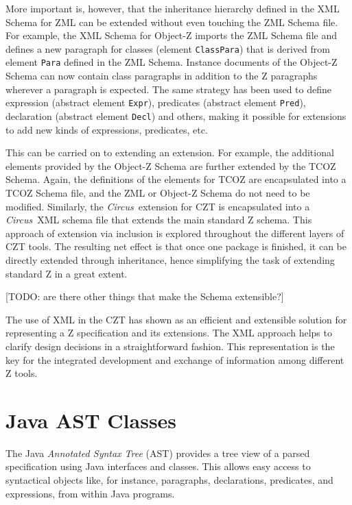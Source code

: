 \documentclass{llncs}
\newcommand{\Circus}{{\sf\slshape Circus}}
\newcommand{\Element}[1]{\texttt{#1}}
\begin{document}
  More important is, however, that the inheritance hierarchy defined
  in the XML Schema for ZML can be extended without even touching the
  ZML Schema file.  For example, the XML Schema for Object-Z imports
  the ZML Schema file and defines a new paragraph for classes (element
  \Element{ClassPara}) that is derived from element \Element{Para}
  defined in the ZML Schema.  Instance documents of the Object-Z
  Schema can now contain class paragraphs in addition to the Z
  paragraphs wherever a paragraph is expected.  The same strategy has
  been used to define expression (abstract element \Element{Expr}),
  predicates (abstract element \Element{Pred}), declaration (abstract
  element \Element{Decl}) and others, making it possible for
  extensions to add new kinds of expressions, predicates, etc.

  This can be carried on to extending an extension.  For example, the
  additional elements provided by the Object-Z Schema are further
  extended by the TCOZ Schema.  Again, the definitions of the elements
  for TCOZ are encapsulated into a TCOZ Schema file, and the ZML or
  Object-Z Schema do not need to be modified.
  Similarly, the \Circus\ extension for CZT is encapsulated into a
  \Circus\ XML schema file that extends the main standard Z schema.
  This approach of extension via inclusion is explored throughout the
  different layers of CZT tools.
  The resulting net effect is that once one package is finished, it
  can be directly extended through inheritance, hence simplifying the
  task of extending standard Z in a great extent.

  [TODO: are there other things that make the Schema extensible?]

  The use of XML in the CZT has shown as an efficient and extensible
  solution for representing a Z specification and its extensions.  The
  XML approach helps to clarify design decisions in a straightforward
  fashion.  This representation is the key for the integrated
  development and exchange of information among different Z tools.

\section{Java AST Classes}\label{java-ast-classes}

  The Java \emph{Annotated Syntax Tree} (AST) provides a tree view of
  a parsed specification using Java interfaces and classes.  This
  allows easy access to syntactical objects like, for instance,
  paragraphs, declarations, predicates, and expressions, from within
  Java programs.
\end{document}
